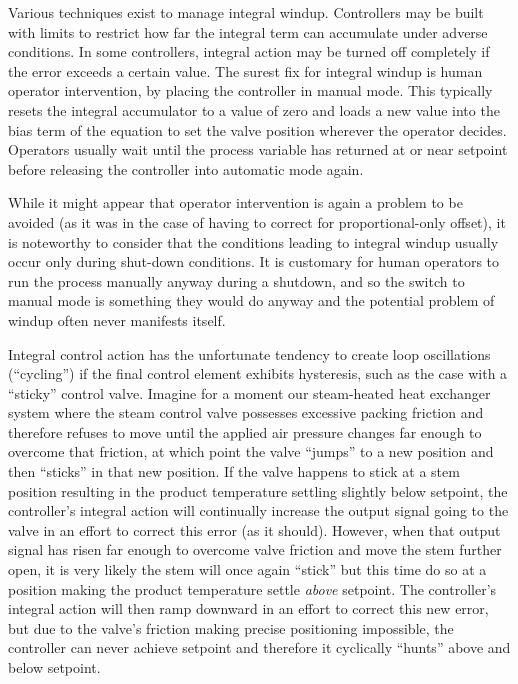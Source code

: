 Various techniques exist to manage integral windup.  Controllers may be built with limits to restrict how far the integral term can accumulate under adverse conditions.  In some controllers, integral action may be turned off completely if the error exceeds a certain value.  The surest fix for integral windup is human operator intervention, by placing the controller in manual mode.  This typically resets the integral accumulator to a value of zero and loads a new value into the bias term of the equation to set the valve position wherever the operator decides.  Operators usually wait until the process variable has returned at or near setpoint before releasing the controller into automatic mode again.

While it might appear that operator intervention is again a problem to be avoided (as it was in the case of having to correct for proportional-only offset), it is noteworthy to consider that the conditions leading to integral windup usually occur only during shut-down conditions.  It is customary for human operators to run the process manually anyway during a shutdown, and so the switch to manual mode is something they would do anyway and the potential problem of windup often never manifests itself.

\vskip 10pt

Integral control action has the unfortunate tendency to create loop oscillations (``cycling'') if the final control element exhibits hysteresis, such as the case with a ``sticky'' control valve.  Imagine for a moment our steam-heated heat exchanger system where the steam control valve possesses excessive packing friction and therefore refuses to move until the applied air pressure changes far enough to overcome that friction, at which point the valve ``jumps'' to a new position and then ``sticks'' in that new position.  If the valve happens to stick at a stem position resulting in the product temperature settling slightly below setpoint, the controller's integral action will continually increase the output signal going to the valve in an effort to correct this error (as it should).  However, when that output signal has risen far enough to overcome valve friction and move the stem further open, it is very likely the stem will once again ``stick'' but this time do so at a position making the product temperature settle \textit{above} setpoint.  The controller's integral action will then ramp downward in an effort to correct this new error, but due to the valve's friction making precise positioning impossible, the controller can never achieve setpoint and therefore it cyclically ``hunts'' above and below setpoint.

